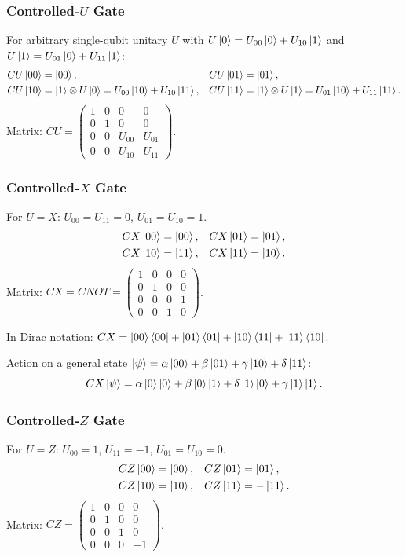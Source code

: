 \documentclass[10pt,a4paper]{article}
\begin{document}
\subsubsection*{Controlled-$U$ Gate}

For arbitrary single-qubit unitary $U$ with $U\ket{0}=U_{00}\ket{0}+U_{10}\ket{1}$ and $U\ket{1}=U_{01}\ket{0}+U_{11}\ket{1}$:
\begin{align*}
CU\ket{00}&=\ket{00}, & CU\ket{01}&=\ket{01}, \\
CU\ket{10}&=\ket{1}\otimes U\ket{0}=U_{00}\ket{10}+U_{10}\ket{11}, & CU\ket{11}&=\ket{1}\otimes U\ket{1}=U_{01}\ket{10}+U_{11}\ket{11}.
\end{align*}
Matrix: $CU=\begin{pmatrix}1&0&0&0\\0&1&0&0\\0&0&U_{00}&U_{01}\\0&0&U_{10}&U_{11}\end{pmatrix}$.

\subsubsection*{Controlled-$X$ Gate}
For $U=X$: $U_{00}=U_{11}=0$, $U_{01}=U_{10}=1$.
\begin{align*}
CX\ket{00}&=\ket{00}, & CX\ket{01}&=\ket{01}, \\
CX\ket{10}&=\ket{11}, & CX\ket{11}&=\ket{10}.
\end{align*}
Matrix: $CX = CNOT =\begin{pmatrix}1&0&0&0\\0&1&0&0\\0&0&0&1\\0&0&1&0\end{pmatrix}$.

In Dirac notation: $CX = \ket{00}\bra{00}+\ket{01}\bra{01}+\ket{10}\bra{11}+\ket{11}\bra{10}$.

Action on a general state $\ket{\psi}=\alpha\ket{00}+\beta\ket{01}+\gamma\ket{10}+\delta\ket{11}$:
\[
CX\ket{\psi} = \alpha\ket{0}\ket{0}+\beta\ket{0}\ket{1}+\delta\ket{1}\ket{0}+\gamma\ket{1}\ket{1}.
\]

\subsubsection*{Controlled-$Z$ Gate}
For $U=Z$: $U_{00}=1$, $U_{11}=-1$, $U_{01}=U_{10}=0$.
\begin{align*}
CZ\ket{00}&=\ket{00}, & CZ\ket{01}&=\ket{01}, \\
CZ\ket{10}&=\ket{10}, & CZ\ket{11}&=-\ket{11}.
\end{align*}
Matrix: $CZ =\begin{pmatrix}1&0&0&0\\0&1&0&0\\0&0&1&0\\0&0&0&-1\end{pmatrix}$.
\end{document}
